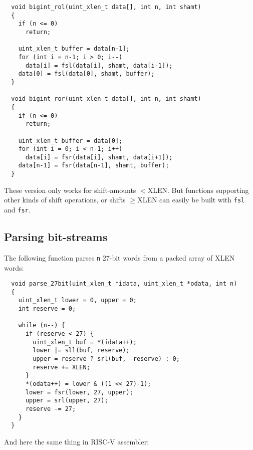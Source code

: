 \begin{minipage}{\linewidth}
\begin{verbatim}
  void bigint_rol(uint_xlen_t data[], int n, int shamt)
  {
    if (n <= 0)
      return;

    uint_xlen_t buffer = data[n-1];
    for (int i = n-1; i > 0; i--)
      data[i] = fsl(data[i], shamt, data[i-1]);
    data[0] = fsl(data[0], shamt, buffer);
  }

  void bigint_ror(uint_xlen_t data[], int n, int shamt)
  {
    if (n <= 0)
      return;

    uint_xlen_t buffer = data[0];
    for (int i = 0; i < n-1; i++)
      data[i] = fsr(data[i], shamt, data[i+1]);
    data[n-1] = fsr(data[n-1], shamt, buffer);
  }
\end{verbatim}
\end{minipage}

These version only works for shift-amounts $<$XLEN. But functions supporting
other kinds of shift operations, or shifts $\ge$XLEN can easily be built
with {\tt fsl} and {\tt fsr}.

\subsection{Parsing bit-streams}

The following function parses {\tt n} 27-bit words from a packed array of XLEN words:

\begin{minipage}{\linewidth}
\begin{verbatim}
  void parse_27bit(uint_xlen_t *idata, uint_xlen_t *odata, int n)
  {
    uint_xlen_t lower = 0, upper = 0;
    int reserve = 0;

    while (n--) {
      if (reserve < 27) {
        uint_xlen_t buf = *(idata++);
        lower |= sll(buf, reserve);
        upper = reserve ? srl(buf, -reserve) : 0;
        reserve += XLEN;
      }
      *(odata++) = lower & ((1 << 27)-1);
      lower = fsr(lower, 27, upper);
      upper = srl(upper, 27);
      reserve -= 27;
    }
  }
\end{verbatim}
\end{minipage}

And here the same thing in RISC-V assembler:

